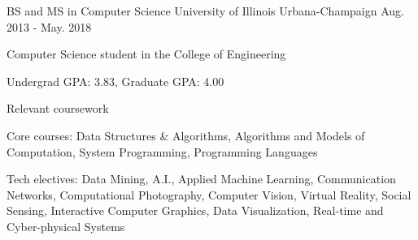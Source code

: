 

\begin{cventries}

  \cventry
    {BS and MS in Computer Science} %
    {University of Illinois} %
    {Urbana-Champaign} %
    {Aug. 2013 - May. 2018} %
    {
      \begin{cvitems} %
        \item {Computer Science student in the College of Engineering}
        \item {Undergrad GPA: 3.83, Graduate GPA: 4.00}
      \end{cvitems}
    }

  \cventry
    {Relevant coursework} %
    {} %
    {} %
    {} %
    {
      \begin{cvitems} %
        \item {Core courses: Data Structures \& Algorithms, Algorithms and Models of Computation, System Programming, Programming Languages}
        \item {Tech electives: Data Mining, A.I., Applied Machine Learning, Communication Networks, Computational Photography, Computer Vision, Virtual Reality, Social Sensing, Interactive Computer Graphics, Data Visualization, Real-time and Cyber-physical Systems}
      \end{cvitems}
    }

\end{cventries}
